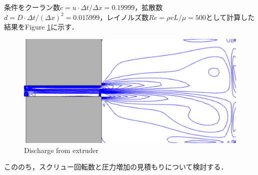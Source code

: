 \documentclass[twocolumn,oneside,a4paper]{article}
\begin{document}
条件をクーラン数$c=u \cdot \Delta t / \Delta x=0.19999$，拡散数$d=D \cdot \Delta t/(\Delta x)^2=0.015999$，レイノルズ数$Re=\rho v L / \mu = 500$として計算した結果をFigure \ref{eq:duct_fs}に示す．

\begin{figure}[htbp]
        \includegraphics[bb=0 0 619 304,width=1\columnwidth]{duct_fs.pdf}
    \caption{Discharge from extruder}
   \label{eq:duct_fs}
\end{figure}

こののち，スクリュー回転数と圧力増加の見積もりについて検討する．





\end{document}

